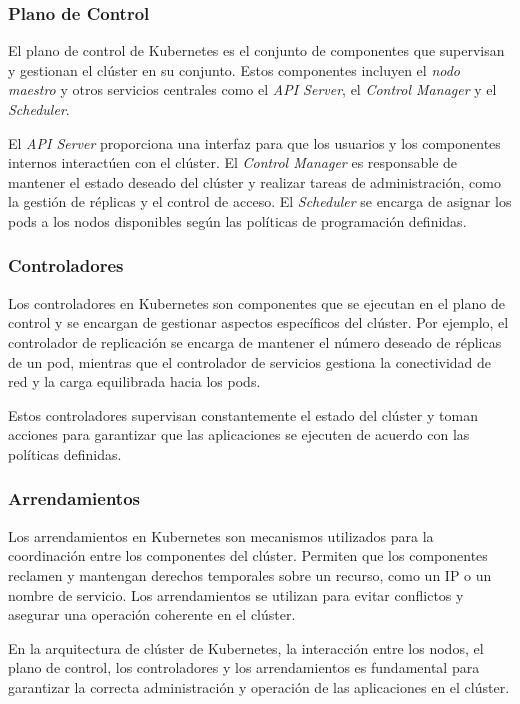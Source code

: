 \documentclass{article}
\begin{document}
\subsubsection{Plano de Control}

El plano de control de Kubernetes es el conjunto de componentes que supervisan y gestionan el clúster en su conjunto. Estos componentes incluyen el \textit{nodo maestro} y otros servicios centrales como el \textit{API Server}, el \textit{Control Manager} y el \textit{Scheduler}.

El \textit{API Server} proporciona una interfaz para que los usuarios y los componentes internos interactúen con el clúster. El \textit{Control Manager} es responsable de mantener el estado deseado del clúster y realizar tareas de administración, como la gestión de réplicas y el control de acceso. El \textit{Scheduler} se encarga de asignar los pods a los nodos disponibles según las políticas de programación definidas.

\subsubsection{Controladores}

Los controladores en Kubernetes son componentes que se ejecutan en el plano de control y se encargan de gestionar aspectos específicos del clúster. Por ejemplo, el controlador de replicación se encarga de mantener el número deseado de réplicas de un pod, mientras que el controlador de servicios gestiona la conectividad de red y la carga equilibrada hacia los pods.

Estos controladores supervisan constantemente el estado del clúster y toman acciones para garantizar que las aplicaciones se ejecuten de acuerdo con las políticas definidas.

\subsubsection{Arrendamientos}

Los arrendamientos en Kubernetes son mecanismos utilizados para la coordinación entre los componentes del clúster. Permiten que los componentes reclamen y mantengan derechos temporales sobre un recurso, como un IP o un nombre de servicio. Los arrendamientos se utilizan para evitar conflictos y asegurar una operación coherente en el clúster.

En la arquitectura de clúster de Kubernetes, la interacción entre los nodos, el plano de control, los controladores y los arrendamientos es fundamental para garantizar la correcta administración y operación de las aplicaciones en el clúster.
\end{document}
